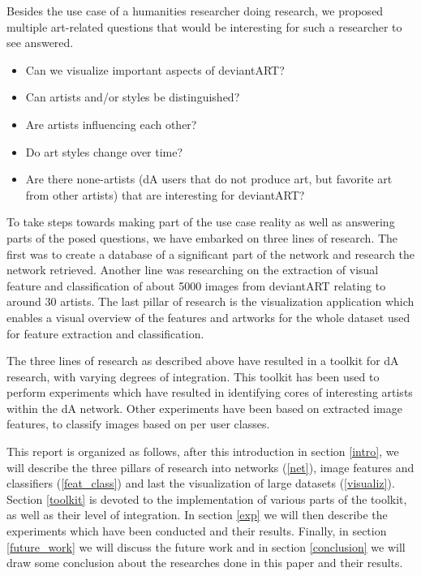 Besides the use case of a humanities researcher doing research, we proposed multiple art-related questions that would be interesting for such a researcher to see answered.
\begin{itemize}
\item Can we visualize important aspects of deviantART?
\item Can artists and/or styles be distinguished?
\item Are artists influencing each other?
\item Do art styles change over time?
\item Are there none-artists (dA users that do not produce art, but favorite art from other artists) that are interesting for deviantART?
\end{itemize}

To take steps towards making part of the use case reality as well as answering parts of the posed questions, we have embarked on three lines of research. The first was to create a database of a significant part of the network and research the network retrieved. Another line was researching on the extraction of visual feature and classification of about 5000 images from deviantART relating to around 30 artists. The last pillar of research is the visualization application which enables a visual overview of the features and artworks for the whole dataset used for feature extraction and classification.

The three lines of research as described above have resulted in a toolkit for dA research, with varying degrees of integration. This toolkit has been used to perform experiments which have resulted in identifying cores of interesting artists within the dA network. Other experiments have been based on extracted image features, to classify images based on per user classes.

This report is organized as follows, after this introduction in section \ref{intro}, we will describe the three pillars of research into networks (\ref{net}), image features and classifiers (\ref{feat_class}) and last the visualization of large datasets (\ref{visualiz}). Section \ref{toolkit} is devoted to the implementation of various parts of the toolkit, as well as their level of integration. In section \ref{exp} we will then describe the experiments which have been conducted and their results. Finally, in section \ref{future_work} we will discuss the future work and in section \ref{conclusion} we will draw some conclusion about the researches done in this paper and their results. 